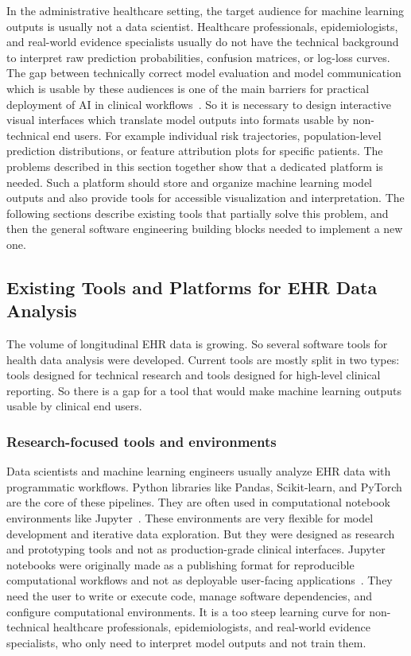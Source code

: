 In the administrative healthcare setting, the target audience for machine learning outputs is usually not a data scientist. Healthcare professionals, epidemiologists, and real-world evidence specialists usually do not have the technical background to interpret raw prediction probabilities, confusion matrices, or log-loss curves. The gap between technically correct model evaluation and model communication which is usable by these audiences is one of the main barriers for practical deployment of AI in clinical workflows~\cite{carrasco_ribelles_2023_jamia, bmj_tripod_ai_2024}. So it is necessary to design interactive visual interfaces which translate model outputs into formats usable by non-technical end users. For example individual risk trajectories, population-level prediction distributions, or feature attribution plots for specific patients. The problems described in this section together show that a dedicated platform is needed. Such a platform should store and organize machine learning model outputs and also provide tools for accessible visualization and interpretation. The following sections describe existing tools that partially solve this problem, and then the general software engineering building blocks needed to implement a new one.


\subsection{Existing Tools and Platforms for EHR Data Analysis}
\label{sec:existing_tools}

The volume of longitudinal EHR data is growing. So several software tools for health data analysis were developed. Current tools are mostly split in two types: tools designed for technical research and tools designed for high-level clinical reporting. So there is a gap for a tool that would make machine learning outputs usable by clinical end users.

\subsubsection{Research-focused tools and environments}
Data scientists and machine learning engineers usually analyze EHR data with programmatic workflows. Python libraries like Pandas, Scikit-learn, and PyTorch are the core of these pipelines. They are often used in computational notebook environments like Jupyter~\cite{kluyver2016jupyter}. These environments are very flexible for model development and iterative data exploration. But they were designed as research and prototyping tools and not as production-grade clinical interfaces. Jupyter notebooks were originally made as a publishing format for reproducible computational workflows and not as deployable user-facing applications~\cite{kluyver2016jupyter}. They need the user to write or execute code, manage software dependencies, and configure computational environments. It is a too steep learning curve for non-technical healthcare professionals, epidemiologists, and real-world evidence specialists, who only need to interpret model outputs and not train them.


